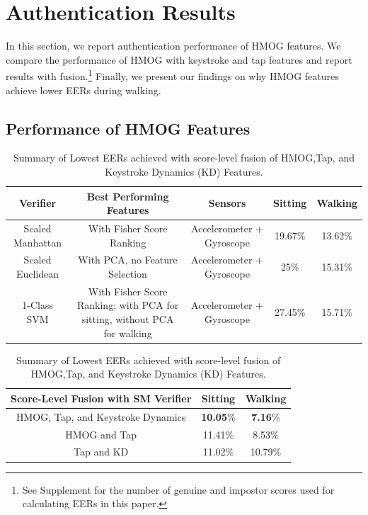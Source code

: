 %
\section{Authentication Results} \label{sectionResults}

In this section, we report authentication performance of HMOG features. We compare the performance of HMOG with keystroke and tap features and report results with fusion.\footnote{See Supplement for the number of genuine and impostor scores used for calculating EERs in this paper.} Finally, we present our findings on why HMOG features achieve lower EERs during walking. %
%

%
%
%
%

\subsection{Performance of HMOG Features}

\begin{table}[!htbp]
%
%
\caption{Summary of Lowest EERs achieved using only HMOG features.}%
\centering
%
%
%
%
%
%
%
%
%
\begin{tabular}{| c | c | c | c | c |} %
\hline
%
%
Verifier 	    			   & Best Performing 	 Features                & Sensors                                &   Sitting             &     Walking   \\ \hline  %
Scaled Manhattan        & With Fisher Score Ranking & Accelerometer + Gyroscope	& 19.67\% & 13.62\%  \\ \hline %
Scaled Euclidean         &  With PCA, no Feature Selection	& Accelerometer + Gyroscope			& 25\% & 15.31\% \\ \hline %
1-Class SVM  		   & With Fisher Score Ranking; with PCA for sitting, without PCA for walking & Accelerometer + Gyroscope	& 27.45\% & 15.71\% \\ \hline %
\end{tabular}
\label{tab:individualperformance}
%
%
\vspace{12pt}
%
%
\caption{Summary of Lowest EERs achieved with score-level fusion of HMOG,Tap, and Keystroke Dynamics (KD) Features.}
\centering
\begin{tabular}{| c | c | c | }%
\hline
%
Score-Level Fusion with SM Verifier 			    		& Sitting          	 	 & Walking \\ \hline %
HMOG, Tap, and Keystroke Dynamics		& \textbf{10.05}\% 		 & \textbf{7.16}\%  \\ \hline %
HMOG and Tap  			    		& 11.41\%      	 	 & 8.53\%  \\ \hline %
Tap and KD				   		& 11.02\%			 & 10.79\% \\ \hline %
\end{tabular}
\label{tab:fusionperformance}
\end{table}


